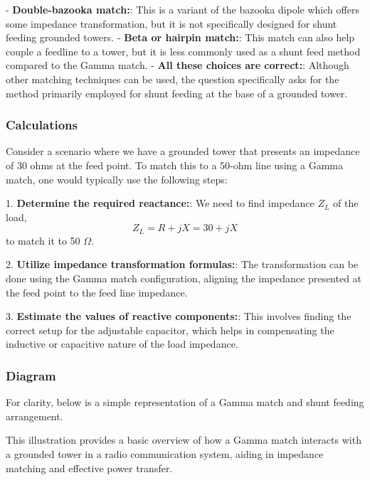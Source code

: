- \textbf{Double-bazooka match:}: This is a variant of the bazooka dipole which offers some impedance transformation, but it is not specifically designed for shunt feeding grounded towers.
- \textbf{Beta or hairpin match:}: This match can also help couple a feedline to a tower, but it is less commonly used as a shunt feed method compared to the Gamma match.
- \textbf{All these choices are correct:}: Although other matching techniques can be used, the question specifically asks for the method primarily employed for shunt feeding at the base of a grounded tower.

\subsubsection{Calculations}

Consider a scenario where we have a grounded tower that presents an impedance of 30 ohms at the feed point. To match this to a 50-ohm line using a Gamma match, one would typically use the following steps:

1. \textbf{Determine the required reactance:}: We need to find impedance \(Z_L\) of the load,
   \[
   Z_L = R + jX = 30 + jX
   \]
   to match it to 50 $\Omega$.

2. \textbf{Utilize impedance transformation formulas:}: The transformation can be done using the Gamma match configuration, aligning the impedance presented at the feed point to the feed line impedance.

3. \textbf{Estimate the values of reactive components:}: This involves finding the correct setup for the adjustable capacitor, which helps in compensating the inductive or capacitive nature of the load impedance.

\subsubsection{Diagram}

For clarity, below is a simple representation of a Gamma match and shunt feeding arrangement.

\begin{center}
\end{center}

This illustration provides a basic overview of how a Gamma match interacts with a grounded tower in a radio communication system, aiding in impedance matching and effective power transfer.
